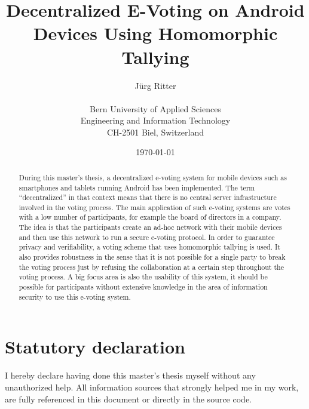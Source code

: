 \documentclass[numbers=noenddot, abstract=on, a4paper, headsepline,
footsepline, oneside, openright, draft=off, listof=leveldown]{scrreprt}
\begin{document}
\title{\bf Decentralized E-Voting on Android Devices Using Homomorphic Tallying}
\subject{Master's Thesis}
\author{Jürg Ritter\\
\\
Bern University of Applied Sciences\\
Engineering and Information Technology\\
CH-2501 Biel, Switzerland\\
}
\date{\today}
\publishers{Advisor:\\
Prof. Dr. Rolf Haenni, Bern University of Applied Sciences\\
\bigskip
Expert:\\
Stephan Neumann, Technical University of Darmstadt}
\maketitle

\clearpage
{}

\begin{abstract}
During this master's thesis, a decentralized e-voting system for mobile devices
such as smartphones and tablets running Android has been implemented. The term
``decentralized'' in that context means that there is no central server
infrastructure involved in the voting process. The main application of such
e-voting systems are votes with a low number of participants, for example the
board of directors in a company. The idea is that the participants create an
ad-hoc network with their mobile devices and then use this network to run a
secure e-voting protocol. In order to guarantee privacy and verifiability, a
voting scheme that uses homomorphic tallying is used. It also provides
robustness in the sense that it is not possible for a single party to break the
voting process just by refusing the collaboration at a certain step throughout
the voting process. A big focus area is also the usability of this system, it
should be possible for participants without extensive knowledge in the area of
information security to use this e-voting system.
\end{abstract}

\chapter*{Statutory declaration}
\label{chap:decalration}

I hereby declare having done this master's thesis myself without any
unauthorized help. All information sources that strongly helped me in my work,
are fully referenced in this document or directly in the source code.
\end{document}
